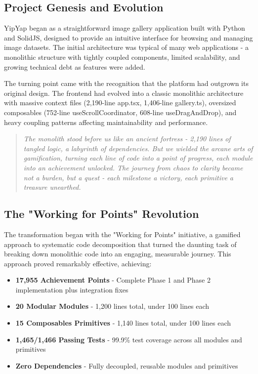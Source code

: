 \documentclass[11pt]{article}
\begin{document}
\subsection{Project Genesis and Evolution}

YipYap began as a straightforward image gallery application built with Python and SolidJS, designed to provide an intuitive interface for browsing and managing image datasets. The initial architecture was typical of many web applications - a monolithic structure with tightly coupled components, limited scalability, and growing technical debt as features were added.

The turning point came with the recognition that the platform had outgrown its original design. The frontend had evolved into a classic monolithic architecture with massive context files (2,190-line app.tsx, 1,406-line gallery.ts), oversized composables (752-line useScrollCoordinator, 608-line useDragAndDrop), and heavy coupling patterns affecting maintainability and performance.

\begin{quote}
\emph{The monolith stood before us like an ancient fortress - 2,190 lines of tangled logic, a labyrinth of dependencies. But we wielded the arcane arts of gamification, turning each line of code into a point of progress, each module into an achievement unlocked. The journey from chaos to clarity became not a burden, but a quest - each milestone a victory, each primitive a treasure unearthed.}
\end{quote}

\subsection{The "Working for Points" Revolution}

The transformation began with the "Working for Points" initiative, a gamified approach to systematic code decomposition that turned the daunting task of breaking down monolithic code into an engaging, measurable journey. This approach proved remarkably effective, achieving:

\begin{itemize}
\item \textbf{17,955 Achievement Points} - Complete Phase 1 and Phase 2 implementation plus integration fixes
\item \textbf{20 Modular Modules} - 1,200 lines total, under 100 lines each
\item \textbf{15 Composables Primitives} - 1,140 lines total, under 100 lines each
\item \textbf{1,465/1,466 Passing Tests} - 99.9\% test coverage across all modules and primitives
\item \textbf{Zero Dependencies} - Fully decoupled, reusable modules and primitives
\end{itemize}
\end{document}
